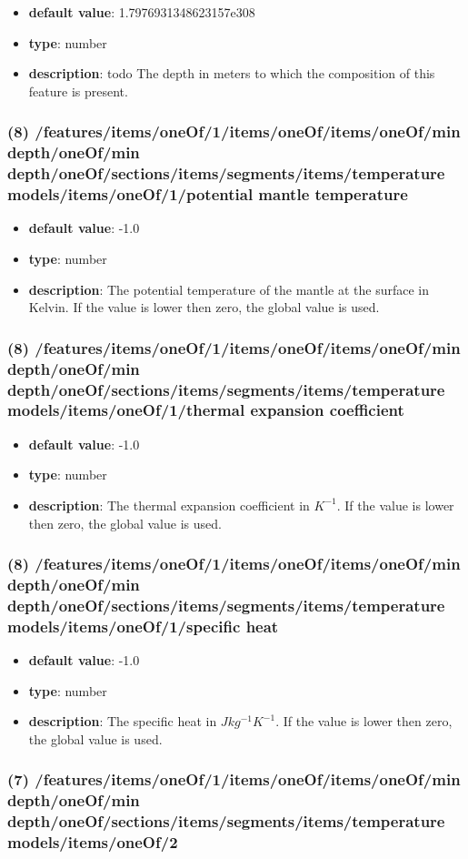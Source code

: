 \begin{itemize}[leftmargin=8em]\item {\bf default value}: 1.7976931348623157e308
\item {\bf type}: number
\item {\bf description}: todo The depth in meters to which the composition of this feature is present.
\end{itemize}\subsubsection{(8) /features/items/oneOf/1/items/oneOf/items/oneOf/min depth/oneOf/min depth/oneOf/sections/items/segments/items/temperature models/items/oneOf/1/potential mantle temperature}
\begin{itemize}[leftmargin=8em]\item {\bf default value}: -1.0
\item {\bf type}: number
\item {\bf description}: The potential temperature of the mantle at the surface in Kelvin. If the value is lower then zero, the global value is used.
\end{itemize}\subsubsection{(8) /features/items/oneOf/1/items/oneOf/items/oneOf/min depth/oneOf/min depth/oneOf/sections/items/segments/items/temperature models/items/oneOf/1/thermal expansion coefficient}
\begin{itemize}[leftmargin=8em]\item {\bf default value}: -1.0
\item {\bf type}: number
\item {\bf description}: The thermal expansion coefficient in $K^{-1}$. If the value is lower then zero, the global value is used.
\end{itemize}\subsubsection{(8) /features/items/oneOf/1/items/oneOf/items/oneOf/min depth/oneOf/min depth/oneOf/sections/items/segments/items/temperature models/items/oneOf/1/specific heat}
\begin{itemize}[leftmargin=8em]\item {\bf default value}: -1.0
\item {\bf type}: number
\item {\bf description}: The specific heat in $J kg^{-1} K^{-1}$. If the value is lower then zero, the global value is used.
\end{itemize}\subsubsection{(7) /features/items/oneOf/1/items/oneOf/items/oneOf/min depth/oneOf/min depth/oneOf/sections/items/segments/items/temperature models/items/oneOf/2}
